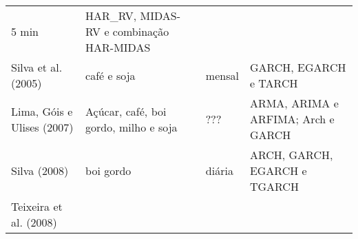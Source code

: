 \documentclass[]{article}
\begin{document}
\begin{longtable}[]{@{}llll@{}}
\begin{minipage}[t]{0.15\columnwidth}
5 min\strut
\end{minipage} & \begin{minipage}[t]{0.23\columnwidth}\raggedright\strut
HAR\_RV, MIDAS-RV e combinação HAR-MIDAS\strut
\end{minipage}\tabularnewline
\begin{minipage}[t]{0.17\columnwidth}\raggedright\strut
Silva et al. (2005)\strut
\end{minipage} & \begin{minipage}[t]{0.17\columnwidth}\raggedright\strut
café e soja\strut
\end{minipage} & \begin{minipage}[t]{0.15\columnwidth}\raggedright\strut
mensal\strut
\end{minipage} & \begin{minipage}[t]{0.23\columnwidth}\raggedright\strut
GARCH, EGARCH e TARCH\strut
\end{minipage}\tabularnewline
\begin{minipage}[t]{0.17\columnwidth}\raggedright\strut
Lima, Góis e Ulises (2007)\strut
\end{minipage} & \begin{minipage}[t]{0.17\columnwidth}\raggedright\strut
Açúcar, café, boi gordo, milho e soja\strut
\end{minipage} & \begin{minipage}[t]{0.15\columnwidth}\raggedright\strut
???\strut
\end{minipage} & \begin{minipage}[t]{0.23\columnwidth}\raggedright\strut
ARMA, ARIMA e ARFIMA; Arch e GARCH\strut
\end{minipage}\tabularnewline
\begin{minipage}[t]{0.17\columnwidth}\raggedright\strut
Silva (2008)\strut
\end{minipage} & \begin{minipage}[t]{0.17\columnwidth}\raggedright\strut
boi gordo\strut
\end{minipage} & \begin{minipage}[t]{0.15\columnwidth}\raggedright\strut
diária\strut
\end{minipage} & \begin{minipage}[t]{0.23\columnwidth}\raggedright\strut
ARCH, GARCH, EGARCH e TGARCH\strut
\end{minipage}\tabularnewline
\begin{minipage}[t]{0.17\columnwidth}\raggedright\strut
Teixeira et al. (2008)\strut
\end{minipage} & \begin{minipage}[t]{0.17\columnwidth}\raggedright\strut

\end{minipage}
\end{longtable}
\end{document}

